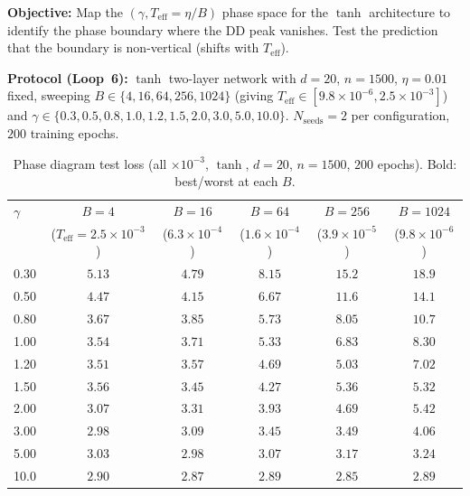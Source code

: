 \documentclass[
  journal=largetwo,
  simfonts=false,
  year=2025,
  volume=37,
]{cup-journal}
\begin{document}
\textbf{Objective:} Map the $(\gamma, T_{\mathrm{eff}} = \eta/B)$ phase space for the $\tanh$ architecture to identify the phase boundary where the DD peak vanishes. Test the prediction that the boundary is non-vertical (shifts with $T_{\mathrm{eff}}$).

\textbf{Protocol (Loop~6):} $\tanh$ two-layer network with $d=20$, $n=1500$, $\eta=0.01$ fixed, sweeping $B \in \{4, 16, 64, 256, 1024\}$ (giving $T_{\mathrm{eff}} \in [9.8\times 10^{-6}, 2.5\times 10^{-3}]$) and $\gamma \in \{0.3, 0.5, 0.8, 1.0, 1.2, 1.5, 2.0, 3.0, 5.0, 10.0\}$. $N_{\mathrm{seeds}} = 2$ per configuration, $200$ training epochs.

\begin{table}[htb]
\centering
\scriptsize
\setlength{\tabcolsep}{3pt}
\caption{Phase diagram test loss (all $\times 10^{-3}$, $\tanh$, $d=20$, $n=1500$, $200$ epochs). Bold: best/worst at each $B$.}
\label{tab:phase_diagram}
\begin{tabular}{ lccccc }
\toprule
$\gamma$ & $B{=}4$ & $B{=}16$ & $B{=}64$ & $B{=}256$ & $B{=}1024$ \\
& {\scriptsize ($T_{\mathrm{eff}}{=}2.5{\times}10^{-3}$)} & {\scriptsize ($6.3{\times}10^{-4}$)} & {\scriptsize ($1.6{\times}10^{-4}$)} & {\scriptsize ($3.9{\times}10^{-5}$)} & {\scriptsize ($9.8{\times}10^{-6}$)} \\
\midrule
0.30 & $5.13$ & $4.79$ & $8.15$ & $\mathbf{15.2}$ & $\mathbf{18.9}$ \\
0.50 & $4.47$ & $4.15$ & $6.67$ & $11.6$ & $14.1$ \\
0.80 & $3.67$ & $3.85$ & $5.73$ & $8.05$ & $10.7$ \\
1.00 & $3.54$ & $3.71$ & $5.33$ & $6.83$ & $8.30$ \\
1.20 & $3.51$ & $3.57$ & $4.69$ & $5.03$ & $7.02$ \\
1.50 & $3.56$ & $3.45$ & $4.27$ & $5.36$ & $5.32$ \\
2.00 & $3.07$ & $3.31$ & $3.93$ & $4.69$ & $5.42$ \\
3.00 & $2.98$ & $3.09$ & $3.45$ & $3.49$ & $4.06$ \\
5.00 & $3.03$ & $\mathbf{2.98}$ & $3.07$ & $3.17$ & $3.24$ \\
10.0  & $\mathbf{2.90}$ & $2.87$ & $\mathbf{2.89}$ & $\mathbf{2.85}$ & $\mathbf{2.89}$ \\
\bottomrule
\end{tabular}
\end{table}
\end{document}
